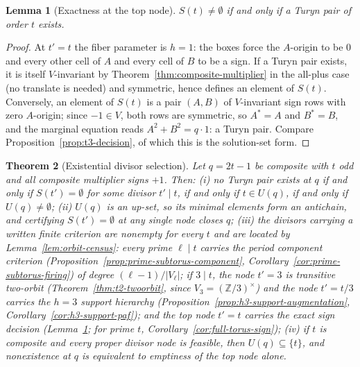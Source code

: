 \documentclass[11pt]{article}
\theoremstyle{plain}
\newtheorem{theorem}{Theorem}[section]
\newtheorem{lemma}[theorem]{Lemma}
\theoremstyle{definition}
\theoremstyle{remark}
\newcommand{\Z}{\mathbb Z}
\begin{document}
\begin{lemma}[Exactness at the top node]\label{lem:top-exact}
$S(t)\ne\emptyset$ if and only if a Turyn pair of order $t$ exists.
\end{lemma}

\begin{proof}
At $t'=t$ the fiber parameter is $h=1$: the boxes force the $A$-origin to be
$0$ and every other cell of $A$ and every cell of $B$ to be a sign.  If a
Turyn pair exists, it is itself $V$-invariant by
Theorem~\ref{thm:composite-multiplier} in the all-plus case (no translate is
needed) and symmetric, hence defines an element of $S(t)$.  Conversely, an
element of $S(t)$ is a pair $(A,B)$ of $V$-invariant sign rows with zero
$A$-origin; since $-1\in V$, both rows are symmetric, so $A^*=A$ and
$B^*=B$, and the marginal equation reads $A^2+B^2=q\cdot1$: a Turyn pair.
Compare Proposition~\ref{prop:t3-decision}, of which this is the
solution-set form.
\end{proof}

\begin{theorem}[Existential divisor selection]\label{thm:divisor-selection}
Let $q=2t-1$ be composite with $t$ odd and all composite multiplier signs
$+1$.  Then:
\emph{(i)} no Turyn pair exists at $q$ if and only if $S(t')=\emptyset$ for
some divisor $t'\mid t$, if and only if $t\in U(q)$, if and only if
$U(q)\ne\emptyset$;
\emph{(ii)} $U(q)$ is an up-set, so its minimal elements form an antichain,
and certifying $S(t')=\emptyset$ at any single node closes $q$;
\emph{(iii)} the divisors carrying a written finite criterion are nonempty
for every $t$ and are located by Lemma~\ref{lem:orbit-census}: every prime
$\ell\mid t$ carries the period component criterion
(Proposition~\ref{prop:prime-subtorus-component},
Corollary~\ref{cor:prime-subtorus-firing}) of degree
$(\ell-1)/|V_\ell|$; if $3\mid t$, the node $t'=3$ is transitive two-orbit
(Theorem~\ref{thm:t2-twoorbit}, since $V_3=(\Z/3)^\times$) and the node
$t'=t/3$ carries the $h=3$ support hierarchy
(Proposition~\ref{prop:h3-support-augmentation},
Corollary~\ref{cor:h3-support-paf}); and the top node $t'=t$ carries the
exact sign decision (Lemma~\ref{lem:top-exact}; for prime $t$,
Corollary~\ref{cor:full-torus-sign});
\emph{(iv)} if $t$ is composite and every proper divisor node is feasible,
then $U(q)\subseteq\{t\}$, and nonexistence at $q$ is equivalent to
emptiness of the top node alone.
\end{theorem}
\end{document}
